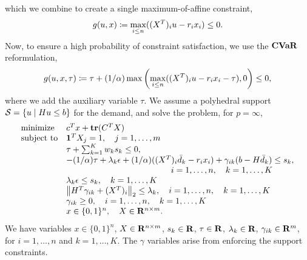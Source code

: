 \documentclass[12pt]{article}
\theoremstyle{thmstyleone}%
\theoremstyle{thmstyletwo}%
\theoremstyle{thmstylethree}%
\newcommand{\reviewChanges}{}
\begin{document}
\reviewChanges{which we combine to create a single maximum-of-affine constraint,
\begin{equation*}
	g(u,x) \coloneqq \max_{i \leq n}((X^T)_i u - r_i x_i) \leq 0.
\end{equation*}
Now, to ensure a high probability of constraint satisfaction, we use the $\mathop{\bf CVaR}$ reformulation, 
\begin{equation*}
	g(u,x,\tau) \coloneqq \tau + (1/\alpha)\max \left (\max_{i \leq n}((X^T)_i u - r_i x_i - \tau), 0\right ) \leq 0,
\end{equation*}
where we add the auxiliary variable $\tau$. We assume a polyhedral support $\mathcal{S}= \{u \mid Hu\leq b\}$ for the demand, and solve the problem, for $p = \infty$,
\begin{equation*}
	\label{eq:mro_facility_mip_ref}
	\begin{array}{ll}
	\text{minimize} & c^Tx  +\Tr(C^TX)\\
	\text{subject to}  &\ones^TX_j = 1,\quad j = 1,\dots, m \\
	&   \tau + \sum_{k=1}^K w_k s_{k}  \leq 0,\\
	 & -(1/\alpha)\tau + \lambda_{k} \epsilon + (1/\alpha)((X^T)_i\bar{d}_k -r_ix_i) + \gamma_{ik}(b - H\bar{d}_k) \leq s_{k},\\
	 &\hspace{4cm} \quad i = 1,\dots,n, \quad k = 1,\dots, K\\
	 & \lambda_{k} \epsilon  \leq s_{k}, \quad k = 1,\dots, K\\
	 & \left\| H^T\gamma_{ik} + (X^T)_i\right\|_2 \leq \lambda_{k}, \quad i = 1,\dots,n, \quad k = 1,\dots, K\\
	 & \gamma_{ik} \geq 0, \quad i = 1,\dots,n, \quad k = 1,\dots, K\\
	 & x\in \{0,1\}^n, \quad X\in \reals^{n\times m}.
	\end{array}
\end{equation*}
We have variables $x \in \{0,1\}^{n}$, $X \in {\mathbf R}^{n\times m}$, $s_{k} \in {\mathbf R}$, $\tau \in {\mathbf R}$, $\lambda_k \in {\mathbf R}$, $\gamma_{ik} \in {\mathbf R}^{m}$, for $i = 1,\dots,n$ and $k= 1,\dots,K$.
The $\gamma$ variables arise from enforcing the support constraints.}

\end{document}
